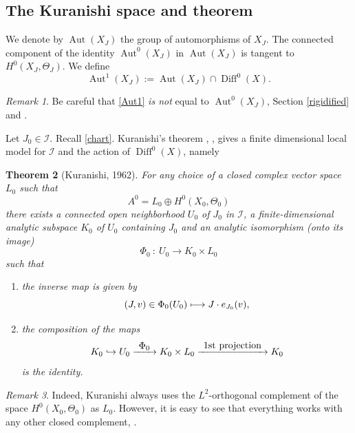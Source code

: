 \documentclass[JEP,XML,SOM,Unicode]{cedram}
\let\mathcal\mathscr
\def\mto{\mathchoice{\longmapsto}{\mapsto}{\mapsto}{\mapsto}}
\def\hto{\mathrel{\lhook\joinrel\to}}
\def\To#1{\mathchoice{\xrightarrow{\textstyle\kern4pt#1\kern3pt}}{\stackrel{#1}{\longrightarrow}}{}{}}
\DeclareMathOperator{\Aut}{Aut}
\DeclareMathOperator{\Diff}{Diff}
\theoremstyle{plain}
\newtheorem{theorem}{Theorem}[section]
\theoremstyle{definition}
\theoremstyle{remark}
\newtheorem{remark}[theorem]{Remark}
\numberwithin{equation}{section}
\newcommand{\cI}{\mathcal{I}}
\begin{document}
\subsection{The Kuranishi space and theorem}
\label{Kuranishi}

We denote by $\Aut(X_J)$ the group of automorphisms of $X_J$. The connected component of the identity $\Aut^0(X_J)$ in $\Aut(X_J)$ is tangent to $H^0(X_J,\Theta_J)$. We define
\begin{equation}
\label{Aut1}
\Aut^1(X_J):=\Aut(X_J)\cap\Diff^0(X).
\end{equation}
\begin{remark}
\label{Autattention}
Be careful that \eqref{Aut1} \emph{is not} equal to $\Aut^0(X_J)$, \cf Section \ref{rigidified} and \cite{Aut1paper}.
\end{remark}

Let $J_0\in \cI$. Recall \eqref{chart}. Kuranishi's theorem \cite{Ku1}, \cite{Kur1}, \cite{Ku3} gives a finite dimensional local model for $\cI$ and the action of $\Diff^0(X)$, namely

\begin{theorem}[Kuranishi, 1962]
\label{KuranishiTheorem}
For any choice of a closed complex vector space~$L_0$ such that
\begin{equation}
\label{A0}
A^0=L_0\oplus H^0(X_0,\Theta_{0})
\end{equation}
there exists a connected open neighborhood $U_0$ of $J_0$ in $\cI$, a finite-dimensional analytic subspace $K_0$ of $U_0$ containing $J_0$ and an analytic isomorphism (onto its image)
\begin{equation}
\label{Phi0}
\Phi_0\ :\ U_0\longrightarrow K_0\times L_0
\end{equation}
such that
\begin{enumerate}
\item
the inverse map is given by
\begin{equation}
\label{Kuranishiaction}
(J,v)\in \Phi_0(U_0)\mto J\cdot e_{J_0}(v),
\end{equation}
\item
the composition of the maps
\begin{equation}
\label{id}
K_0\hto U_0\To{\Phi_0} K_0\times L_0 \To{\textup{1st projection}}K_0
\end{equation}
is the identity.
\end{enumerate}
\end{theorem}

\begin{remark}
Indeed, Kuranishi always uses the $L^2$-orthogonal complement of the space $H^0(X_0,\Theta_{0})$ as $L_0$. However, it is easy to see that everything works with any other closed complement, \cf \cite{circle}.
\end{remark}
\end{document}
